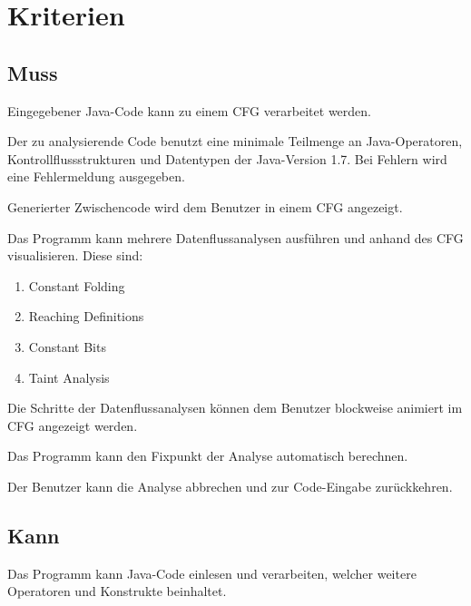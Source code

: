 
\section{Kriterien}

\subsection{Muss}

Eingegebener Java-Code kann zu einem CFG verarbeitet werden.

Der zu analysierende Code benutzt eine minimale Teilmenge an Java-Operatoren, Kontrollflussstrukturen und Datentypen der Java-Version 1.7. Bei Fehlern wird eine Fehlermeldung ausgegeben.

Generierter Zwischencode wird dem Benutzer in einem CFG angezeigt.

Das Programm kann mehrere Datenflussanalysen ausführen und anhand des CFG visualisieren.
Diese sind:\par
\begin{enumerate}[label=(\alph*)]
\item Constant Folding
\item Reaching Definitions
\item Constant Bits
\item Taint Analysis
\end{enumerate}

Die Schritte der Datenflussanalysen können dem Benutzer blockweise animiert im CFG angezeigt werden.

Das Programm kann den Fixpunkt der Analyse automatisch berechnen.

Der Benutzer kann die Analyse abbrechen und zur Code-Eingabe zurückkehren.

\subsection{Kann}

Das Programm kann Java-Code einlesen und verarbeiten, welcher weitere Operatoren und Konstrukte beinhaltet.


